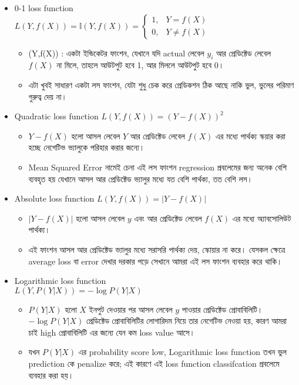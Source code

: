 \documentclass[graybox, envcountchap, twocolumn]{styles/svmult}
\newcommand\abs[1]{\left\lvert#1\right\rvert}
\begin{document}
\begin{itemize}


\item 0-1 loss function \\ $L(Y,f(X))=\mathbb{I}(Y,f(X))=\begin{cases} 1, & Y=f(X) \\ 0, & Y \neq f(X) \end{cases}$ %

\begin{itemize}
    \item {}(Y,f(X)) : {\bengalifont একটা ইন্ডিকেটর ফাংশন, যেখানে যদি actual লেবেল  $ y_i $  আর প্রেডিক্টেড লেবেল  $f(X)$  না মিলে, তাহলে আউটপুট হবে 1, আর মিললে আউটপুট হবে 0।}
    \item {\bengalifont এটা খুবই সাধারণ একটা লস ফাংশন, যেটা শুধু চেক করে প্রেডিকশন ঠিক আছে নাকি ভুল, ভুলের পরিমাণ গুরুত্ব দেয় না।}
\end{itemize}


\item Quadratic loss function $L(Y,f(X))=\left(Y-f(X)\right)^2$ %
\begin{itemize}
    \item $Y−f(X)$ {\bengalifont হলো আসল লেবেল $Y$ আর প্রেডিক্টেড লেবেল $f(X)$ এর মধ্যে পার্থক্য স্কয়ার করা হচ্ছে নেগেটিভ ভ্যালুকে পরিহার করার জন্যে। }
    \item Mean Squared Error {\bengalifont নামেই চেনা এই লস ফাংশন regression প্রবলেমের জন্য অনেক বেশি ব্যবহৃত হয় যেখানে আসল আর প্রেডিক্টেড ভ্যালুর মধ্যে যত বেশি পার্থক্য, তত বেশি লস। }
\end{itemize}

\item Absolute loss function $L(Y,f(X))=\abs{Y-f(X)}$  %
\begin{itemize}
    \item $\abs{Y-f(X)}$  {\bengalifont হলো আসল লেবেল $y$ এবং  আর প্রেডিক্টেড লেবেল $f(X)$ এর মধ্যে অ্যাবসোলিউট পার্থক্য।} 
    \item {\bengalifont এই ফাংশন আসল আর প্রেডিক্টেড ভ্যালুর মধ্যে সরাসরি পার্থক্য দেয়, স্কোয়ার না করে। যেসকল ক্ষেত্রে average loss বা error দেখার দরকার পড়ে সেখানে আমরা এই লস ফাংশন ব্যবহার করে থাকি। }
\end{itemize}
\item Logarithmic loss function \\ $L(Y,P(Y|X))=-\log{P(Y|X)}$ %
\begin{itemize}
    \item $P(Y|X)$  {\bengalifont হলো $X$ ইনপুট দেওয়ার পর আসল লেবেল $y$ পাওয়ার প্রেডিক্টেড প্রোবাবিলিটি।  $-\log{P(Y|X)}$ প্রেডিক্টেড প্রোবাবিলিটির লোগারিদম নিয়ে তার নেগেটিভ নেওয়া হয়, কারণ আমরা চাই high প্রোবাবিলিটি এর জন্যে যেন কম loss value আসে। }
    \item { যখন $P(Y|X)$ এর probability score low, Logarithmic loss function তখন ভুল prediction কে penalize করে; এই কারণে এই loss function classifcation প্রবলেমে ব্যবহার করা হয়। }
\end{itemize}

\end{itemize}
\end{document}
